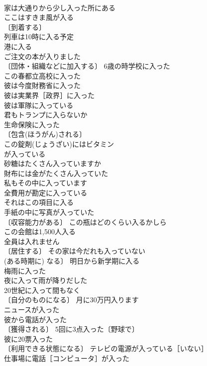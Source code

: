 \documentclass[8pt]{extreport}
\begin{document}
\begin{CJK}{UTF8}{min}
\\	家は大通りから少し入った所にある 
\\	ここはすきま風が入る 
\\	〔到着する〕
\\	列車は10時に入る予定 
\\	港に入る 
\\	ご注文の本が入りました 
\\	〔団体・組織などに加入する〕 6歳の時学校に入った 
\\	この春都立高校に入った 
\\	彼は今度財務省に入った 
\\	彼は実業界［政界］に入った 
\\	彼は軍隊に入っている 
\\	君もトランプに入らないか 
\\	生命保険に入った 
\\	〔包含(ほうがん)される〕 
\\	この錠剤(じょうざい)にはビタミン
\\	が入っている 
\\	砂糖はたくさん入っていますか 
\\	財布には金がたくさん入っていた 
\\	私もその中に入っています 
\\	全費用が勘定に入っている 
\\	それはこの項目に入る 
\\	手紙の中に写真が入っていた 
\\	〔収容能力がある〕 この瓶はどのくらい入るかしら 
\\	この会館は1,500人入る 
\\	全員は入れません 
\\	〔居住する〕 その家は今だれも入っていない 
\\	(ある時期に) なる〕 明日から新学期に入る 
\\	梅雨に入った 
\\	夜に入って雨が降りだした 
\\	20世紀に入って間もなく 
\\	〔自分のものになる〕 月に30万円入ります 
\\	ニュースが入った 
\\	彼から電話が入った 
\\	〔獲得される〕 5回に3点入った〔野球で〕 
\\	彼に20票入った 
\\	〔利用できる状態になる〕 テレビの電源が入っている［いない］ 
\\	仕事場に電話［コンピュータ］が入った 

\end{CJK}
\end{document}
